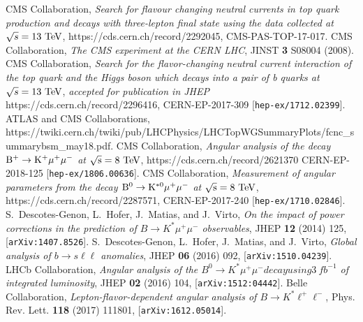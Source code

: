 \documentclass{PoS}
\begin{document}
\begin{thebibliography}{99}

  CMS Collaboration,
  \emph{Search for flavour changing neutral currents in top quark production and decays with three-lepton final state using the data collected at $\sqrt{s} = 13~{\rm TeV}$},
  https://cds.cern.ch/record/2292045, CMS-PAS-TOP-17-017.
  CMS Collaboration,
  \emph{The CMS experiment at the CERN LHC},
  JINST {\bf 3} S08004 (2008).
  CMS Collaboration,
  \emph{Search for the flavor-changing neutral current interaction of the top quark and the Higgs boson which decays into a pair of b quarks at $\sqrt{s} = 13~{\rm TeV}$},
  \emph{accepted for publication in JHEP}
  https://cds.cern.ch/record/2296416, CERN-EP-2017-309
  [{\tt hep-ex/1712.02399}].
  ATLAS and CMS Collaborations,
  https://twiki.cern.ch/twiki/pub/LHCPhysics/LHCTopWGSummaryPlots/fcnc\_summarybsm\_may18.pdf.
  CMS Collaboration,
  \emph{Angular analysis of the decay ${\rm B^+ \to K^+\mu^+\mu^-}$ at ${\rm \sqrt{s} = 8~TeV}$},
  https://cds.cern.ch/record/2621370 CERN-EP-2018-125
  [{\tt hep-ex/1806.00636}].
  CMS Collaboration,
  \emph{Measurement of angular parameters from the decay ${\rm B^0 \to K^{*0}\mu^+\mu^-}$ at ${\rm \sqrt{s} = 8~TeV}$},
  https://cds.cern.ch/record/2287571, CERN-EP-2017-240
  [{\tt hep-ex/1710.02846}].  
  S.~Descotes-Genon, L.~Hofer, J.~Matias, and J.~Virto,
  \emph{On the impact of power corrections in the prediction of $B \to K^*\mu^+\mu^-$ observables},
  JHEP {\bf 12} (2014) 125, [{\tt arXiv:1407.8526}].
  S.~Descotes-Genon, L.~Hofer, J.~Matias, and J.~Virto,
  \emph{Global analysis of $b \to s\ell\ell$ anomalies},
  JHEP {\bf 06} (2016) 092, [{\tt arXiv:1510.04239}].
  LHCb Collaboration,
  \emph{Angular analysis of the $B^0 \to K^*\mu^+\mu^- decay using 3~fb^{-1}$ of integrated luminosity},
  JHEP {\bf 02} (2016) 104, [{\tt arXiv:1512:04442}].
  Belle Collaboration,
  \emph{Lepton-flavor-dependent angular analysis of $B \to K^* \ell^+\ell^-$},
  Phys. Rev. Lett. {\bf 118} (2017) 111801, [{\tt arXiv:1612.05014}].
\end{thebibliography}
\end{document}
